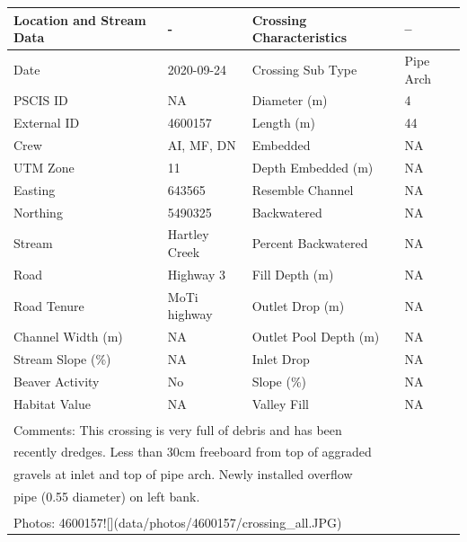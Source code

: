 \documentclass[
]{book}
\begin{document}
\begin{tabular}{l|l|l|l}
\hline
Location and Stream Data & - & Crossing Characteristics & --\\
\hline
Date & 2020-09-24 & Crossing Sub Type & Pipe Arch\\
\hline
PSCIS ID & NA & Diameter (m) & 4\\
\hline
External ID & 4600157 & Length (m) & 44\\
\hline
Crew & AI, MF, DN & Embedded & NA\\
\hline
UTM Zone & 11 & Depth Embedded (m) & NA\\
\hline
Easting & 643565 & Resemble Channel & NA\\
\hline
Northing & 5490325 & Backwatered & NA\\
\hline
Stream & Hartley Creek & Percent Backwatered & NA\\
\hline
Road & Highway 3 & Fill Depth (m) & NA\\
\hline
Road Tenure & MoTi highway & Outlet Drop (m) & NA\\
\hline
Channel Width (m) & NA & Outlet Pool Depth (m) & NA\\
\hline
Stream Slope (\%) & NA & Inlet Drop & NA\\
\hline
Beaver Activity & No & Slope (\%) & NA\\
\hline
Habitat Value & NA & Valley Fill & NA\\
\hline
\multicolumn{4}{l}{\textsuperscript{} Comments: This crossing is very full of debris and has been}\\
\multicolumn{4}{l}{recently dredges.  Less than 30cm freeboard from top of aggraded}\\
\multicolumn{4}{l}{gravels at inlet and top of pipe arch.  Newly installed overflow}\\
\multicolumn{4}{l}{pipe (0.55 diameter) on left bank.}\\
\multicolumn{4}{l}{\textsuperscript{} Photos: 4600157![](data/photos/4600157/crossing\_all.JPG)}\\
\end{tabular}
\end{document}
